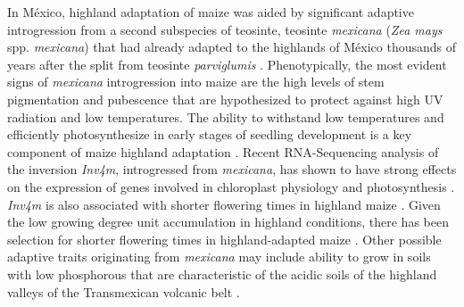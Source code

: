 \documentclass[9pt,twocolumn,twoside,lineno]{BioRxiv}
\begin{document}
In México, highland adaptation of maize was aided by significant adaptive introgression from a second subspecies of teosinte, teosinte \textit{mexicana} (\textit{Zea mays} spp. \textit{mexicana}) that had already adapted to the highlands of México thousands of years after the split from teosinte \textit{parviglumis} \cite{Hufford2013-gs, Gonzalez-Segovia2019-jy}. 
Phenotypically, the most evident signs of \textit{mexicana} introgression into maize are the high levels of stem pigmentation and pubescence \cite{Lauter2004-eq} that are hypothesized to protect against high UV radiation and low temperatures. 
The ability to withstand low temperatures and efficiently photosynthesize in early stages of seedling development is a key component of maize highland adaptation \cite{Hardacre1980-tq}.
Recent RNA-Sequencing analysis of the inversion \textit{Inv4m}, introgressed from \textit{mexicana}, has shown to have strong effects on the expression of genes involved in chloroplast physiology and photosynthesis \cite{Crow2020-gene}.  
\textit{Inv4m} is also associated with shorter flowering times in highland maize \cite{Romero_Navarro2017-cn, Gates2019-xu}. 
Given the low growing degree unit accumulation in highland conditions, there has been selection for shorter flowering times in highland-adapted maize \cite{Gates2019-xu}. %
Other possible adaptive traits originating from \textit{mexicana} may include ability to grow in soils with low phosphorous \cite{AguirreLiguori2019-fl, Fustier2017-sl} that are characteristic of the acidic soils of the highland valleys of the Transmexican volcanic belt \cite{Krasilnikov2013-sm}.
\end{document}
